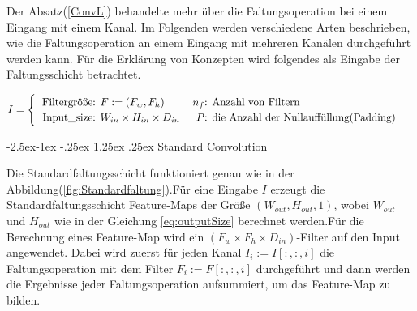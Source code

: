 \documentclass[12pt,a4paper]{scrartcl}
\makeatletter
\numberwithin{equation}{section}
\renewcommand\paragraph{\@startsection{paragraph}{4}{\z@}%
	{-2.5ex\@plus -1ex \@minus -.25ex}%
	{1.25ex \@plus .25ex}%
	{\normalfont\normalsize\bfseries}}
\makeatother
\begin{document}
Der Absatz(\ref{ConvL}) behandelte mehr über die Faltungsoperation bei einem Eingang mit einem Kanal. Im Folgenden werden verschiedene Arten beschrieben, wie die Faltungsoperation an einem Eingang mit mehreren Kanälen durchgeführt werden kann. Für die Erklärung von Konzepten wird folgendes als Eingabe der Faltungsschicht betrachtet.

 \[ I=\begin{cases}

 \begin{tabular}{r@{: }l r@{: }l}
 Filtergröße& $ F:=(F_w, F_h) $  & 	$ n_{f}$& Anzahl von Filtern\\
 Input\_{size}& $ W_{in}\times H_{in}\times D_{in} $ & $ P $ & die Anzahl der Nullauffüllung(Padding)
 \end{tabular}
 
 \end{cases}\]

\paragraph{Standard Convolution}\label{CONV}

Die Standardfaltungsschicht funktioniert genau wie in der Abbildung(\ref{fig:Standardfaltung}).Für eine Eingabe $ I $ erzeugt die Standardfaltungsschicht Feature-Maps der Größe $(W_{out},H_{out}, 1) $, wobei $W_{out} $ und $H_{out} $ wie in der Gleichung \ref{eq:outputSize} berechnet werden.Für die Berechnung eines Feature-Map wird ein $ (F_w\times F_h\times D_{in}) $-Filter auf den Input angewendet. Dabei wird zuerst für jeden Kanal $ I_i :=I[:,:, i]$ die Faltungsoperation mit dem Filter $ F_i := F[:,:,i] $ durchgeführt und dann werden die Ergebnisse jeder Faltungsoperation aufsummiert, um das Feature-Map zu bilden.
\end{document}
